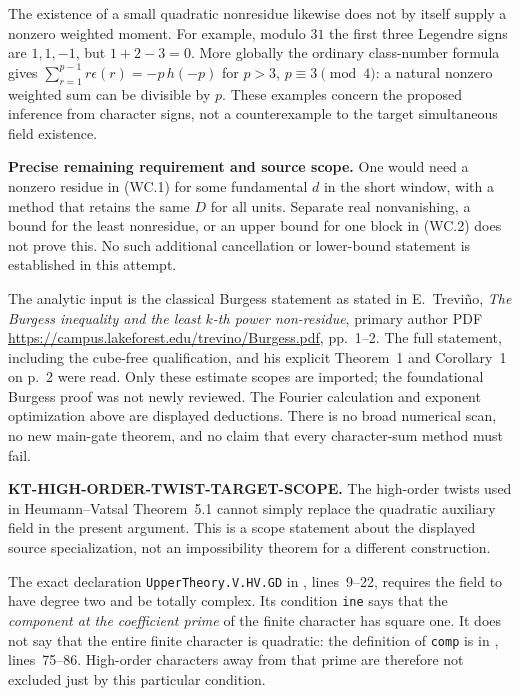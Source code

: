 \documentclass[11pt,a4paper]{article}
\theoremstyle{definition}
\renewcommand{\paragraph}[1]{\par\smallskip\noindent\textbf{#1}\quad\ignorespaces}
\begin{document}
The existence of a small quadratic nonresidue likewise
does not by itself supply a nonzero weighted moment.
For example, modulo $31$ the first three Legendre signs
are $1,1,-1$, but $1+2-3=0$.  More globally the
ordinary class-number formula gives
$\sum_{r=1}^{p-1}r\epsilon(r)=-p\,h(-p)$ for
$p>3$, $p\equiv3\pmod4$: a natural nonzero weighted
sum can be divisible by $p$.  These examples concern
the proposed inference from character signs, not a
counterexample to the target simultaneous field existence.

\paragraph{Precise remaining requirement and source scope.}
One would need a nonzero residue in (WC.1) for some
fundamental $d$ in the short window, with a method that
retains the same $D$ for all units.  Separate real
nonvanishing, a bound for the least nonresidue, or an
upper bound for one block in (WC.2) does not prove this.
No such additional cancellation or lower-bound statement
is established in this attempt.

The analytic input is the classical Burgess statement
as stated in E.~Trevi\~no, \emph{The Burgess inequality
and the least $k$-th power non-residue}, primary author
PDF \url{https://campus.lakeforest.edu/trevino/Burgess.pdf},
pp.~1--2.  The full statement, including the cube-free
qualification, and his explicit Theorem~1 and Corollary~1
on p.~2 were read.  Only these estimate scopes are
imported; the foundational Burgess proof was not newly
reviewed.  The Fourier calculation and exponent
optimization above are displayed deductions.
There is no broad numerical scan, no new main-gate
theorem, and no claim that every character-sum method
must fail.



\paragraph{KT-HIGH-ORDER-TWIST-TARGET-SCOPE.}
The high-order twists used in Heumann--Vatsal Theorem~5.1
cannot simply replace the quadratic auxiliary field in the present
argument. This is a scope statement about the displayed source
specialization, not an impossibility theorem for a different construction.

The exact declaration \texttt{UpperTheory.V.HV.GD} in
, lines~9--22, requires
the field to have degree two and be totally complex. Its condition
\texttt{ine} says that the \emph{component at the coefficient prime}
of the finite character has square one. It does not say that the
entire finite character is quadratic: the definition of
\texttt{comp} is in
,
lines~75--86. High-order characters away from that prime are
therefore not excluded just by this particular condition.
\end{document}
